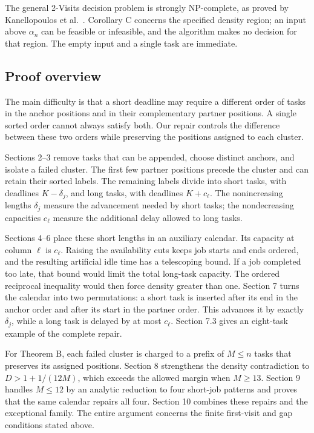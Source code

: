 \documentclass[11pt,a4paper]{article}
\begin{document}
The general 2-Visits decision problem is strongly NP-complete, as proved by Kanellopoulos et al.~\cite{ref:KPK+26}. Corollary C concerns the specified density region; an input above \(\alpha_n\) can be feasible or infeasible, and the algorithm makes no decision for that region. The empty input and a single task are immediate.

\hypertarget{proof-overview}{%
\subsection*{Proof overview}\label{proof-overview}}

The main difficulty is that a short deadline may require a different order of tasks in the anchor positions and in their complementary partner positions. A single sorted order cannot always satisfy both. Our repair controls the difference between these two orders while preserving the positions assigned to each cluster.

Sections 2--3 remove tasks that can be appended, choose distinct anchors, and isolate a failed cluster. The first few partner positions precede the cluster and can retain their sorted labels. The remaining labels divide into short tasks, with deadlines \(K-\delta_j\), and long tasks, with deadlines \(K+c_\ell\). The nonincreasing lengths \(\delta_j\) measure the advancement needed by short tasks; the nondecreasing capacities \(c_\ell\) measure the additional delay allowed to long tasks.

Sections 4--6 place these short lengths in an auxiliary calendar. Its capacity at column \(\ell\) is \(c_\ell\). Raising the availability cuts keeps job starts and ends ordered, and the resulting artificial idle time has a telescoping bound. If a job completed too late, that bound would limit the total long-task capacity. The ordered reciprocal inequality would then force density greater than one. Section 7 turns the calendar into two permutations: a short task is inserted after its end in the anchor order and after its start in the partner order. This advances it by exactly \(\delta_j\), while a long task is delayed by at most \(c_\ell\). Section 7.3 gives an eight-task example of the complete repair.

For Theorem B, each failed cluster is charged to a prefix of \(M\le n\) tasks that preserves its assigned positions. Section 8 strengthens the density contradiction to \(D>1+1/(12M)\), which exceeds the allowed margin when \(M\ge13\). Section 9 handles \(M\le12\) by an analytic reduction to four short-job patterns and proves that the same calendar repairs all four. Section 10 combines these repairs and the exceptional family. The entire argument concerns the finite first-visit and gap conditions stated above.
\end{document}
